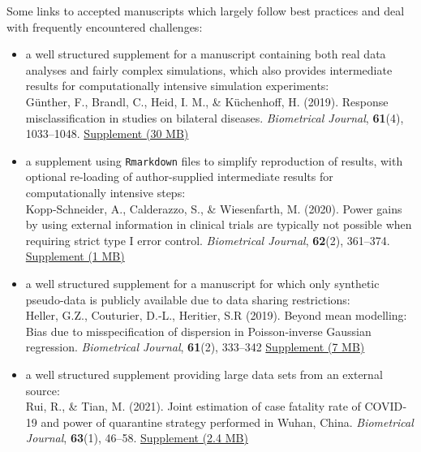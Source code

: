 \documentclass[
  paper=a4,
  ,captions=tableheading
]{scrartcl}
\providecommand{\tightlist}{%
  \setlength{\itemsep}{0pt}\setlength{\parskip}{0pt}}
\let\oldtexttt\texttt
\renewcommand{\texttt}[1]{\colorbox{bgcolor}{\small \oldtexttt{#1}}}
\begin{document}
Some links to accepted manuscripts which largely follow best practices and deal with frequently encountered challenges:

\begin{itemize}
\tightlist
\item
  a well structured supplement for a manuscript containing both real data analyses and fairly complex simulations, which also provides intermediate results for computationally intensive simulation experiments:\\
  Günther, F., Brandl, C., Heid, I. M., \& Küchenhoff, H. (2019). Response misclassification in studies on bilateral diseases. \emph{Biometrical Journal}, \textbf{61}(4), 1033--1048. \href{https://onlinelibrary.wiley.com/action/downloadSupplement?doi=10.1002\%2Fbimj.201900039&file=bimj2010-sup-0002-Code-and-Data.zip}{Supplement (30 MB)}
\item
  a supplement using \texttt{Rmarkdown} files to simplify reproduction of results, with optional re-loading of author-supplied intermediate results for computationally intensive steps:\\
  Kopp‐Schneider, A., Calderazzo, S., \& Wiesenfarth, M. (2020). Power gains by using external information in clinical trials are typically not possible when requiring strict type I error control. \emph{Biometrical Journal}, \textbf{62}(2), 361--374. \href{https://onlinelibrary.wiley.com/action/downloadSupplement?doi=10.1002\%2Fbimj.201800395&file=bimj2027-sup-0001-Code.zip}{Supplement (1 MB)}
\item
  a well structured supplement for a manuscript for which only synthetic pseudo-data is publicly available due to data sharing restrictions:\\
  Heller, G.Z., Couturier, D.‐L., Heritier, S.R (2019). Beyond mean modelling: Bias due to misspecification of dispersion in Poisson‐inverse Gaussian regression. \emph{Biometrical Journal}, \textbf{61}(2), 333--342 \href{https://onlinelibrary.wiley.com/action/downloadSupplement?doi=10.1002\%2Fbimj.201700218&file=bimj1892-sup-0001-SupMat.zip}{Supplement (7 MB)}
\item
  a well structured supplement providing large data sets from an external source:\\
  Rui, R., \& Tian, M. (2021). Joint estimation of case fatality rate of COVID‐19 and power of quarantine strategy performed in Wuhan, China. \emph{Biometrical Journal}, \textbf{63}(1), 46--58. \href{https://onlinelibrary.wiley.com/action/downloadSupplement?doi=10.1002\%2Fbimj.202000116&file=bimj2197-sup-0001-SuppMat.zip}{Supplement (2.4 MB)}
\end{itemize}
\end{document}
